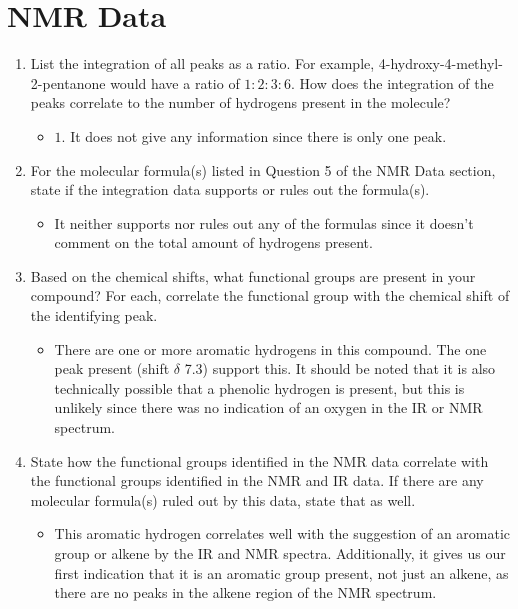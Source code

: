 \documentclass[titlepage]{article}
\begin{document}
\section*{ NMR Data}
\begin{enumerate}
    \item List the integration of all peaks as a ratio. For example, 4-hydroxy-4-methyl-2-pentanone would have a ratio of $1:2:3:6$. How does the integration of the peaks correlate to the number of hydrogens present in the molecule?
    \begin{itemize}
        \item $1$. It does not give any information since there is only one peak.
    \end{itemize}
    \item For the molecular formula(s) listed in Question 5 of the  NMR Data section, state if the integration data supports or rules out the formula(s).
    \begin{itemize}
        \item It neither supports nor rules out any of the formulas since it doesn't comment on the total amount of hydrogens present.
    \end{itemize}
    \item Based on the chemical shifts, what functional groups are present in your compound? For each, correlate the functional group with the chemical shift of the identifying peak.
    \begin{itemize}
        \item There are one or more aromatic hydrogens in this compound. The one peak present (shift $\delta$ 7.3) support this. It should be noted that it is also technically possible that a phenolic hydrogen is present, but this is unlikely since there was no indication of an oxygen in the IR or  NMR spectrum.
    \end{itemize}
    \item State how the functional groups identified in the  NMR data correlate with the functional groups identified in the  NMR and IR data. If there are any molecular formula(s) ruled out by this data, state that as well.
    \begin{itemize}
        \item This aromatic hydrogen correlates well with the suggestion of an aromatic group or alkene by the IR and  NMR spectra. Additionally, it gives us our first indication that it is an aromatic group present, not just an alkene, as there are no peaks in the alkene region of the  NMR spectrum.

\end{itemize}
\end{enumerate}
\end{document}
